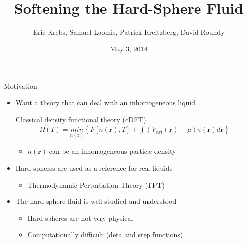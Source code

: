 \documentclass{beamer}
\title{Softening the Hard-Sphere Fluid}
\author{Eric Krebs, Samuel Loomis, Patrick Kreitzberg, David Roundy}
\institute{Oregon State University}
\date{May 3, 2014}
\newcommand{\rr}{\textbf{r}}
\begin{document}

\begin{frame}
 \titlepage
\end{frame}

\begin{frame}{Motivation}
  \begin{itemize}
    \item Want a theory that can deal with an inhomogeneous liquid
      \begin{block}{Classical density functional theory (cDFT)}
        \begin{align}
          \Omega(T) = \underset{n(\rr)}{min} \left\{F[n(\rr),T] + \int
          \left(V_{ext}(\rr) - \mu \right)n(\rr)d\rr \right\}
        \end{align}
        \begin{itemize}
        \item $n(\rr)$ can be an inhomogeneous particle density
        \end{itemize}
      \end{block}
    \item Hard spheres are used as a reference for real liquids
      \begin{itemize}
        \item Thermodynamic Perturbation Theory (TPT)
      \end{itemize}
    \item The hard-sphere fluid is well studied and understood
      \begin{itemize}
        \item Hard spheres are not very physical
        \item Computationally difficult (deta and step functions)
      \end{itemize}
  \end{itemize}
\end{frame}
\end{document}

